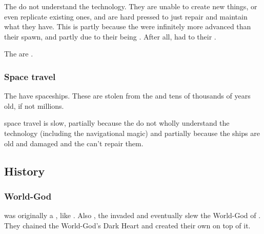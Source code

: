 The \banes{} do not understand the technology. They are unable to create new things, or even replicate existing ones, and are hard pressed to just repair and maintain what they have. 
This is partly because the \voyagers{} were infinitely more advanced than their \bane{} spawn, and partly due to their being . 
After all, 
 had to 
 their \resphain.

The \resphain are .





\subsubsection{Space travel}
The \banes{} have spaceships. 
These are stolen from the \voyagers{} and tens of thousands of years old, if not millions. 

\Bane{} space travel is slow, partially because the \banes{} do not wholly understand the technology (including the navigational magic) and partially because the ships are old and damaged and the \banes{} can't repair them. 









\subsection{History}





\subsubsection{World-God}
\Erebos was originally a , like \Miith.
Also , the \voyagers invaded and eventually slew the World-God of \Erebos.
They chained the World-God's Dark Heart and created their own \dweomer on top of it.





